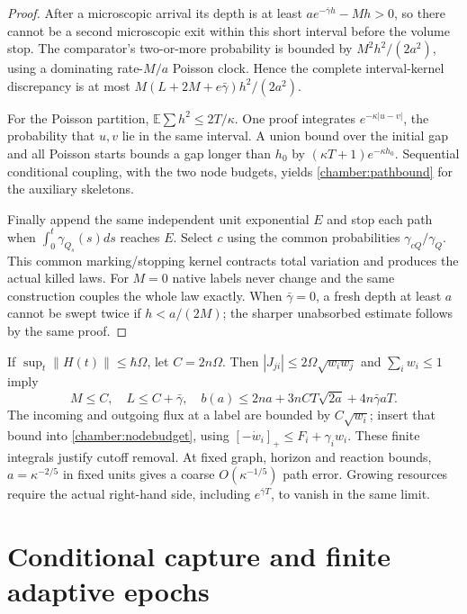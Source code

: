 \documentclass[11pt,oneside,openany]{book}
\theoremstyle{definition}
\theoremstyle{remark}\newtheorem{remark}[theorem]{Remark}
\begin{document}
\begin{proof}
After a microscopic arrival its depth is at least $ae^{-\bar\gamma h}-Mh>0$, so there cannot be a second microscopic exit within this short interval before the volume stop. The comparator's two-or-more probability is bounded by $M^2h^2/(2a^2)$, using a dominating rate-$M/a$ Poisson clock. Hence the complete interval-kernel discrepancy is at most $M(L+2M+e\bar\gamma)h^2/(2a^2)$.

For the Poisson partition, $\mathbb E\sum h^2\le2T/\kappa$. One proof integrates $e^{-\kappa|u-v|}$, the probability that $u,v$ lie in the same interval. A union bound over the initial gap and all Poisson starts bounds a gap longer than $h_0$ by $(\kappa T+1)e^{-\kappa h_0}$. Sequential conditional coupling, with the two node budgets, yields \eqref{chamber:pathbound} for the auxiliary skeletons.

Finally append the same independent unit exponential $E$ and stop each path when $\int_0^t\gamma_{Q_s}(s)ds$ reaches $E$. Select $c$ using the common probabilities $\gamma_{cQ}/\gamma_Q$. This common marking/stopping kernel contracts total variation and produces the actual killed laws. For $M=0$ native labels never change and the same construction couples the whole law exactly. When $\bar\gamma=0$, a fresh depth at least $a$ cannot be swept twice if $h<a/(2M)$; the sharper unabsorbed estimate follows by the same proof.
\end{proof}

If $\sup_t\|H(t)\|\le\hbar\Omega$, let $C=2n\Omega$. Then $|J_{ji}|\le2\Omega\sqrt{w_iw_j}$ and $\sum_iw_i\le1$ imply
\begin{equation}
 M\le C,\quad L\le C+\bar\gamma,\quad
 b(a)\le2na+3nCT\sqrt{2a}+4n\bar\gamma aT.
 \label{chamber:explicitnodes}
\end{equation}
The incoming and outgoing flux at a label are bounded by $C\sqrt{w_i}$; insert that bound into \eqref{chamber:nodebudget}, using $[-\dot w_i]_+\le F_i+\gamma_iw_i$. These finite integrals justify cutoff removal. At fixed graph, horizon and reaction bounds, $a=\kappa^{-2/5}$ in fixed units gives a coarse $O(\kappa^{-1/5})$ path error. Growing resources require the actual right-hand side, including $e^{\bar\gamma T}$, to vanish in the same limit.

\section{Conditional capture and finite adaptive epochs}
\end{document}
